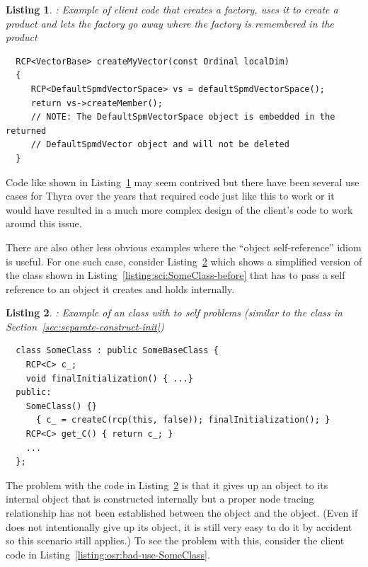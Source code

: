\documentclass[pdf,ps2pdf,11pt]{SANDreport}
\newtheorem{listing}{Listing}
\begin{document}
{}\begin{listing}: Example of client code that creates a factory, uses
it to create a product and lets the factory go away where the factory
is remembered in the product
\label{listing:osr:DefaultSpmdVectorSpace-use-delete}
{\small\begin{verbatim}
  RCP<VectorBase> createMyVector(const Ordinal localDim)
  {
     RCP<DefaultSpmdVectorSpace> vs = defaultSpmdVectorSpace();
     return vs->createMember();
     // NOTE: The DefaultSpmVectorSpace object is embedded in the returned
     // DefaultSpmdVector object and will not be deleted
  }
\end{verbatim}}
\end{listing}


Code like shown in
Listing~\ref{listing:osr:DefaultSpmdVectorSpace-use-delete} may seem
contrived but there have been several use cases for Thyra over the
years that required code just like this to work or it would have
resulted in a much more complex design of the client's code to work
around this issue.

There are also other less obvious examples where the ``object
self-reference'' idiom is useful.  For one such case, consider
Listing~\ref{listing:osr:SomeClass-before} which shows a simplified
version of the class shown in
Listing~\ref{listing:sci:SomeClass-before} that has to pass a self
reference to an object it creates and holds internally.


{}\begin{listing}: Example of an class with {} to self
problems (similar to the class in
Section~\ref{sec:separate-construct-init})
\label{listing:osr:SomeClass-before}
{\small\begin{verbatim}
  class SomeClass : public SomeBaseClass {
    RCP<C> c_;
    void finalInitialization() { ...}
  public:
    SomeClass() {}
      { c_ = createC(rcp(this, false)); finalInitialization(); }
    RCP<C> get_C() { return c_; }
    ...
  };
\end{verbatim}}
\end{listing}


The problem with the code in
Listing~\ref{listing:osr:SomeClass-before} is that it gives up an
{} object to its internal {} object that is
constructed internally but a proper node tracing relationship has not
been established between the {} object and the
{} object.  (Even if {} does not
intentionally give up its {} object, it is still very easy
to do it by accident so this scenario still applies.)  To see the
problem with this, consider the client code in
Listing~\ref{listing:osr:bad-use-SomeClass}.
\end{document}
